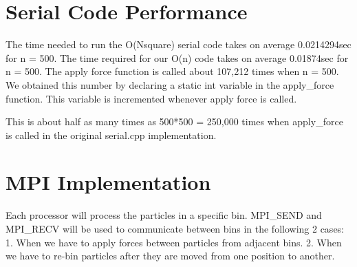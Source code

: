 \documentclass[11pt]{amsart}
\begin{document}
\section{Serial Code Performance}

The time needed to run the O(Nsquare) serial code takes on average 0.0214294sec for n = 500.
The time required for our O(n) code takes on average 0.01874sec for n = 500.
The apply force function is called about 107,212 times when n = 500. 
We obtained this number by declaring a static int variable in the apply_force function. This variable is incremented whenever apply force is called.


This is about half as many times as 500*500 = 250,000 times when apply_force is called in the original serial.cpp implementation.
 
\section{MPI Implementation}

Each processor will process the particles in a specific bin.
MPI_SEND and MPI_RECV will be used to communicate between bins in the following 2 cases:
1. When we have to apply forces between particles from adjacent bins.
2. When we have to re-bin particles after they are moved from one position to another.
\end{document}
